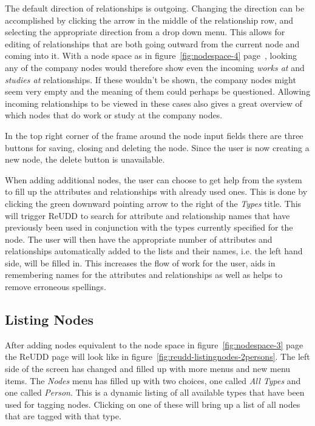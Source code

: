 \documentclass[a4paper]{report}
\begin{document}
The default direction of relationships is outgoing. Changing the direction can be accomplished by clicking the arrow in the middle of the relationship row, and selecting the appropriate direction from a drop down menu. This allows for editing of relationships that are both going outward from the current node and coming into it. With a node space as in figure~\ref{fig:nodespace-4} page~\pageref{fig:nodespace-4}, looking any of the company nodes would therefore show even the incoming \emph{works at} and \emph{studies at} relationships. If these wouldn't be shown, the company nodes might seem very empty and the meaning of them could perhaps be questioned. Allowing incoming relationships to be viewed in these cases also gives a great overview of which nodes that do work or study at the company nodes.

In the top right corner of the frame around the node input fields there are three buttons for saving, closing and deleting the node. Since the user is now creating a new node, the delete button is unavailable.

When adding additional nodes, the user can choose to get help from the system to fill up the attributes and relationships with already used ones. This is done by clicking the green downward pointing arrow to the right of the \emph{Types} title. This will trigger ReUDD to search for attribute and relationship names that have previously been used in conjunction with the types currently specified for the node. The user will then have the appropriate number of attributes and relationships automatically added to the lists and their names, i.e. the left hand side, will be filled in. This increases the flow of work for the user, aids in remembering names for the attributes and relationships as well as helps to remove erroneous spellings.

\subsection{Listing Nodes} \label{sec:listing-nodes}

After adding nodes equivalent to the node space in figure~\ref{fig:nodespace-3} page~\pageref{fig:nodespace-3} the ReUDD page will look like in figure~\ref{fig:reudd-listingnodes-2persons}. The left side of the screen has changed and filled up with more menus and new menu items. The \emph{Nodes} menu has filled up with two choices, one called \emph{All Types} and one called \emph{Person}. This is a dynamic listing of all available types that have been used for tagging nodes. Clicking on one of these will bring up a list of all nodes that are tagged with that type. 
\end{document}
